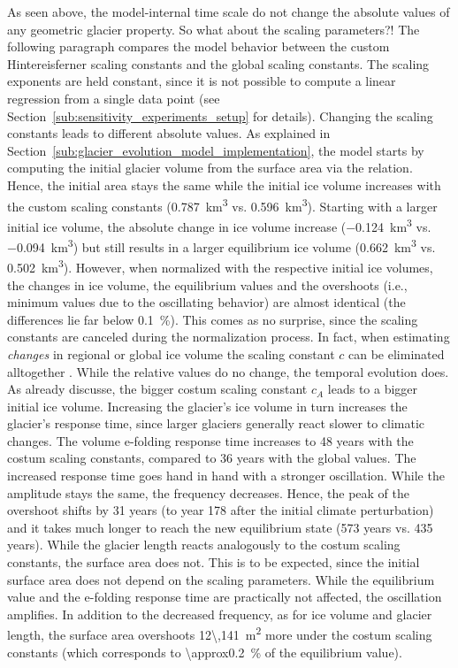       As seen above, the model-internal time scale do not change the absolute values of any geometric glacier property. So what about the scaling parameters?! The following paragraph compares the model behavior between the custom Hintereisferner scaling constants and the global scaling constants. The scaling exponents are held constant, since it is not possible to compute a linear regression from a single data point (see Section~\ref{sub:sensitivity_experiments_setup} for details). %
      Changing the scaling constants leads to different absolute values. As explained in Section~\ref{sub:glacier_evolution_model_implementation}, the \vas{} model starts by computing the initial glacier volume from the surface area via the \vas{} relation. Hence, the initial area stays the same while the initial ice volume increases with the custom scaling constants (\SI{0.787}{\cubic\kilo\meter} vs. \SI{0.596}{\cubic\kilo\meter}). Starting with a larger initial ice volume, the absolute change in ice volume increase (\SI{-0.124}{\cubic\kilo\meter} vs. \SI{-0.094}{\cubic\kilo\meter}) but still results in a larger equilibrium ice volume (\SI{0.662}{\cubic\kilo\meter} vs. \SI{0.502}{\cubic\kilo\meter}). However, when normalized with the respective initial ice volumes, the changes in ice volume, the equilibrium values and the overshoots (i.e., minimum values due to the oscillating behavior) are almost identical (the differences lie far below \SI{0.1}{\percent}). This comes as no surprise, since the scaling constants are canceled during the normalization process. In fact, when estimating \emph{changes} in regional or global ice volume the scaling constant $c$ can be eliminated alltogether \citep[][Section 8.5]{Bahr2015}. While the relative values do no change, the temporal evolution does. As already discusse, the bigger costum scaling constant $c_A$ leads to a bigger initial ice volume. Increasing the glacier's ice volume in turn increases the glacier's response time, since larger glaciers generally react slower to climatic changes. The volume e-folding response time increases to 48 years with the costum scaling constants, compared to 36 years with the global values. The increased response time goes hand in hand with a stronger oscillation. While the amplitude stays the same, the frequency decreases. Hence, the peak of the overshoot shifts by 31 years (to year 178 after the initial climate perturbation) and it takes much longer to reach the new equilibrium state (573 years vs. 435 years).
      While the glacier length reacts analogously to the costum scaling constants, the surface area does not. This is to be expected, since the initial surface area does not depend on the scaling parameters. While the equilibrium value and the e-folding response time are practically not affected, the oscillation amplifies. In addition to the decreased frequency, as for ice volume and glacier length, the surface area overshoots \SI{12\,141}{\square\meter} more under the costum scaling constants (which corresponds to \SI{\approx0.2}{\percent} of the equilibrium value).
      
